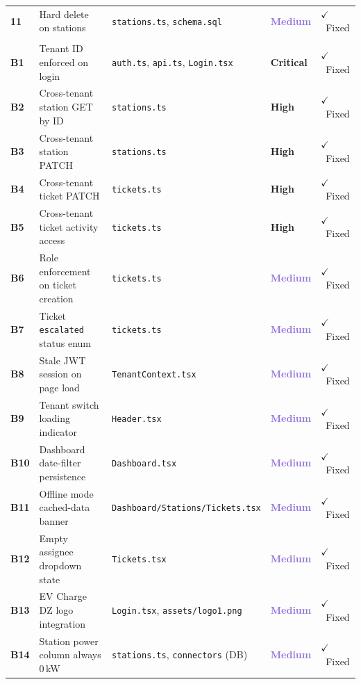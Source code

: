 \documentclass[12pt,a4paper]{report}
\newcommand{\critical}{\textcolor{criticalred}{\textbf{Critical}}}
\newcommand{\high}{\textcolor{highorange}{\textbf{High}}}
\newcommand{\medium}{\textcolor{mediumpurple}{\textbf{Medium}}}
\newcommand{\fixed}{\textcolor{greenfg}{$\checkmark$~Fixed}}
\newcommand{\file}[1]{\texttt{\small #1}}
\begin{document}
\begin{longtable}{
			>{\centering\bfseries}p{0.5cm}
			p{4.0cm}
			p{4.2cm}
			p{1.9cm}
			p{1.6cm}
		}
		\rowcolor{rowalt}
		11 & Hard delete on stations &
		\file{stations.ts}, \file{schema.sql} &
		\medium & \fixed \\

		\multicolumn{5}{l}{\cellcolor{lightblue}\textbf{\color{brandblue}
		Additional Fixes \& Improvements --- May 2026}} \\

		B1 & Tenant ID enforced on login &
		\file{auth.ts}, \file{api.ts}, \file{Login.tsx} &
		\critical & \fixed \\

		\rowcolor{rowalt}
		B2 & Cross-tenant station GET by ID &
		\file{stations.ts} &
		\high & \fixed \\

		B3 & Cross-tenant station PATCH &
		\file{stations.ts} &
		\high & \fixed \\

		\rowcolor{rowalt}
		B4 & Cross-tenant ticket PATCH &
		\file{tickets.ts} &
		\high & \fixed \\

		B5 & Cross-tenant ticket activity access &
		\file{tickets.ts} &
		\high & \fixed \\

		\rowcolor{rowalt}
		B6 & Role enforcement on ticket creation &
		\file{tickets.ts} &
		\medium & \fixed \\

		B7 & Ticket \texttt{escalated} status enum &
		\file{tickets.ts} &
		\medium & \fixed \\

		\rowcolor{rowalt}
		B8 & Stale JWT session on page load &
		\file{TenantContext.tsx} &
		\medium & \fixed \\

		B9 & Tenant switch loading indicator &
		\file{Header.tsx} &
		\medium & \fixed \\

		\rowcolor{rowalt}
		B10 & Dashboard date-filter persistence &
		\file{Dashboard.tsx} &
		\medium & \fixed \\

		B11 & Offline mode cached-data banner &
		\file{Dashboard/Stations/Tickets.tsx} &
		\medium & \fixed \\

		\rowcolor{rowalt}
		B12 & Empty assignee dropdown state &
		\file{Tickets.tsx} &
		\medium & \fixed \\

		B13 & EV Charge DZ logo integration &
		\file{Login.tsx}, \file{assets/logo1.png} &
		\medium & \fixed \\

		\rowcolor{rowalt}
		B14 & Station power column always 0\,kW &
		\file{stations.ts}, \file{connectors} (DB) &
		\medium & \fixed \\

	\end{longtable}
	
\end{document}
